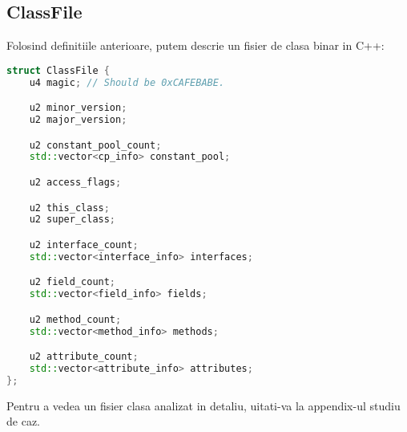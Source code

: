 \subsection{ClassFile}\label{classfile}

Folosind definitiile anterioare, putem descrie un fisier de clasa binar
in C++:

\begin{lstlisting}[language=C++]
struct ClassFile {
    u4 magic; // Should be 0xCAFEBABE.

    u2 minor_version;
    u2 major_version;

    u2 constant_pool_count;
    std::vector<cp_info> constant_pool;

    u2 access_flags;

    u2 this_class;
    u2 super_class;

    u2 interface_count;
    std::vector<interface_info> interfaces;

    u2 field_count;
    std::vector<field_info> fields;

    u2 method_count;
    std::vector<method_info> methods;

    u2 attribute_count;
    std::vector<attribute_info> attributes;
};
\end{lstlisting}

Pentru a vedea un fisier clasa analizat in detaliu, uitati-va la appendix-ul studiu de caz.
